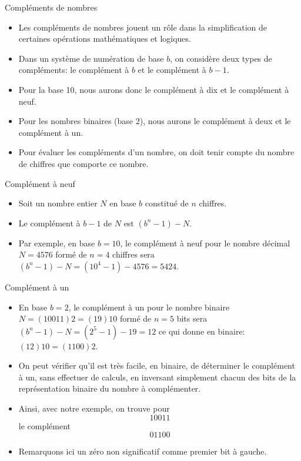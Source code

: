 \documentclass[presentation]{beamer}
\begin{document}
\begin{frame}[label={sec:orgfd834d4}]{Compléments de nombres}
\begin{itemize}
\item Les compléments de nombres jouent un rôle dans la simplification de certaines opérations mathématiques et logiques.

\item Dans un système de numération de base \(b\), on considère deux types de compléments: le complément à \(b\) et le complément à \(b-1\).

\item Pour la base 10, nous aurons donc le complément à dix et le complément à neuf.

\item Pour les nombres binaires (base 2), nous aurons le complément à deux et le complément à un.

\item Pour évaluer les compléments d'un nombre, on doit tenir compte du nombre de chiffres que comporte ce nombre.
\end{itemize}
\end{frame}

\begin{frame}[label={sec:org9bf0cba}]{Complément à neuf}
\begin{itemize}
\item Soit un nombre entier \(N\) en base \(b\) constitué de \(n\) chiffres.

\item Le complément à \(b-1\) de \(N\) est \((b^n-1)-N\).

\item Par exemple, en base \(b=10\), le complément à neuf pour le nombre décimal \(N = 4576\) formé de \(n=4\) chiffres sera \((b^n-1)-N = (10^4 -1) - 4576 = 5424\).
\end{itemize}
\end{frame}

\begin{frame}[label={sec:org9512260}]{Complément à un}
\begin{itemize}
\item En base \(b=2\), le complément à un pour le nombre binaire \(N = (10011)2 = (19)10\) formé de \(n=5\) bits sera \((b^n-1)-N = (2^5 -1) - 19 = 12\) ce qui donne en binaire: \((12)10 = (1100)2\).

\item On peut vérifier qu'il est très facile, en binaire, de déterminer le complément à un, sans effectuer de calculs, en inversant simplement chacun des bits de la représentation binaire du nombre à complémenter.

\item Ainsi, avec notre exemple, on trouve pour  $$ 10011 $$ le complément $$ 01100 $$

\item Remarquons ici un zéro non significatif comme premier bit à gauche.
\end{itemize}
\end{frame}
\end{document}
